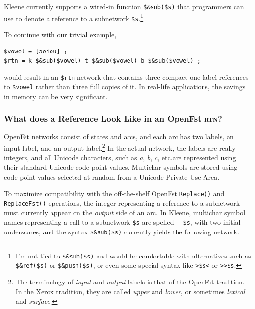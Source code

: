\documentclass[letterpaper,12pt]{article}
\newcommand{\acro}{\textsc}
\begin{document}
Kleene currently supports a wired-in function \verb!$&sub($s)! that
programmers can use to denote a reference to a subnetwork \verb!$s!.\footnote{I'm
not tied to \verb!$&sub($s)! and would be comfortable with alternatives such
as \verb!$&ref($s)! or \verb!$&push($s)!, or even some special syntax like
\verb!>$s<! or \verb!>>$s!.} 

To continue with our trivial example, 

\begin{Verbatim}[fontsize=\small]
$vowel = [aeiou] ;
$rtn = k $&sub($vowel) t $&sub($vowel) b $&sub($vowel) ;
\end{Verbatim}

\noindent
would result in an \verb!$rtn! network that contains three compact
one-label references to \verb!$vowel! rather than three full copies of
it.  In real-life applications, the savings in memory can be very
significant.

\subsubsection{What does a Reference Look Like in an OpenFst \acro{rtn}?}

OpenFst networks consist of states and arcs, and each arc has two labels,
an input label, and an output label.\footnote{The terminology of
\emph{input} and \emph{output} labels is that of the OpenFst tradition.
In the Xerox tradition, they are called \emph{upper} and \emph{lower}, or
sometimes \emph{lexical} and \emph{surface}.}  In the actual network, the
labels are really integers, and all Unicode characters, such as \emph{a},
\emph{b}, \emph{c}, etc.\@ are represented using their standard Unicode
code point values.  Multichar symbols are stored using code point values
selected at random from a Unicode Private Use Area.

To maximize compatibility with the off-the-shelf OpenFst
\texttt{Replace()} and \texttt{ReplaceFst()} operations, the integer
representing a reference to a subnetwork must currently appear on the
\emph{output} side of an arc.  In Kleene, multichar symbol names
representing a call to a subnetwork \verb!$s! are spelled \verb!__$s!,
with two initial underscores, and the syntax \verb!$&sub($s)!  currently
yields the following network.
\end{document}
